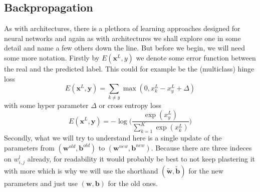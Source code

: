 \documentclass[preprint,12pt,3p]{elsarticle}
\begin{document}
\subsection{Backpropagation}

As with architectures, there is a plethora of learning approaches designed for neural networks and again as with architectures we shall explore one in some detail and name a few others down the line. But before we begin, we will need some more notation. Firstly by $E(\mathbf{x}^L,y)$ we denote some error function between the real and the predicted label. This could for example be the (multiclass) hinge loss
$$E(\mathbf{x}^L,\mathbf{y})=\sum_{k\neq y}\max(0,x^L_k-x^L_y+\Delta)$$
with some hyper parameter $\Delta$ or cross entropy loss
$$E(\mathbf{x}^L,\mathbf{y})=-\log\Big(\frac{\exp(x^L_y)}{\sum_{k=1}^K\exp(x_k^L)}\Big)$$
Secondly, what we will try to understand here is a single update of the parameters from $(\mathbf{w}^{old},\mathbf{b}^{old})$ to $(\mathbf{w}^{new},\mathbf{b}^{new})$. Because there are three indeces on $w^l_{i,j}$ already, for readability it would probably be best to not keep plastering it with more which is why we will use the shorthand $(\tilde{\mathbf{w}},\tilde{\mathbf{b}})$ for the new parameters and just use $(\mathbf{w},\mathbf{b})$ for the old ones.
\end{document}

